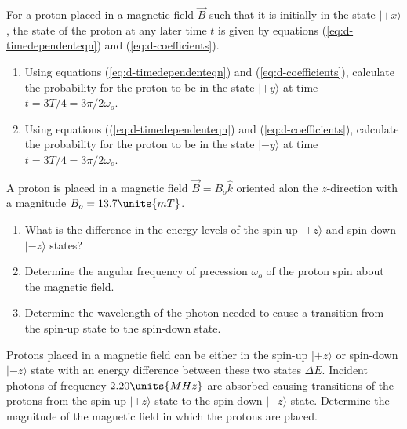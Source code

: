 \begin{problem}
For a proton placed in a magnetic field $\vec{B}$ such that it is initially in the state $\vert\mbox{$+x$}\rangle$, the state of the proton at any later time $t$ is given by equations (\ref{eq:d-timedependenteqn}) and (\ref{eq:d-coefficients}).  
\begin{enumerate}
\item Using equations (\ref{eq:d-timedependenteqn}) and (\ref{eq:d-coefficients}), calculate the probability for the proton to be in the state $\vert\mbox{$+y$}\rangle$ at time $t = 3T/4 = 3\pi/2\omega_o$.
\item Using equations ((\ref{eq:d-timedependenteqn}) and (\ref{eq:d-coefficients}), calculate the probability for the proton to be in the state $\vert\mbox{$-y$}\rangle$ at time $t = 3T/4 = 3\pi/2\omega_o$.
\end{enumerate}
\end{problem}

\begin{problem}
A proton is placed in a magnetic field $\vec{B} = B_o \hat{k}$ oriented alon the $z$-direction with a magnitude $B_o = 13.7 \units{mT}$.
\begin{enumerate}
\item What is the difference in the energy levels of the spin-up $\vert\mbox{$+z$}\rangle$ and spin-down $\vert\mbox{$-z$}\rangle$ states?
\item Determine the angular frequency of precession $\omega_o$ of the proton spin about the magnetic field.
\item Determine the wavelength of the photon needed to cause a transition from the spin-up state to the spin-down state.
\end{enumerate}
\end{problem}

\begin{problem}
Protons placed in a magnetic field can be either in the spin-up $\vert\mbox{$+z$}\rangle$ or spin-down $\vert\mbox{$-z$}\rangle$ state with an energy difference between these two states $\Delta E$.  Incident photons of frequency $2.20 \units{MHz}$ are absorbed causing transitions of the protons from the spin-up $\vert\mbox{$+z$}\rangle$ state to the spin-down $\vert\mbox{$-z$}\rangle$ state.  Determine the magnitude of the magnetic field in which the protons are placed.
\end{problem}
